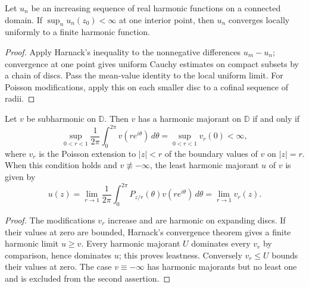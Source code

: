 \begin{theorem}
  \label{thm:harnack_convergence}
  \leanok
  Let $u_n$ be an increasing sequence of real harmonic functions on a
  connected domain. If $\sup_n u_n(z_0)<\infty$ at one interior point,
  then $u_n$ converges locally uniformly to a finite harmonic function.
  \begin{proof}
    \leanok
    Apply Harnack's inequality to the nonnegative differences $u_m-u_n$;
    convergence at one point gives uniform Cauchy estimates on compact
    subsets by a chain of discs. Pass the mean-value identity to the local
    uniform limit. For Poisson modifications, apply this on each smaller
    disc to a cofinal sequence of radii.
  \end{proof}
\end{theorem}

\begin{theorem}
  \label{thm:I_6_7}
  \leanok
  \mainline
  Let $v$ be subharmonic on $\mathbb{D}$. Then $v$ has a harmonic majorant on
  $\mathbb{D}$ if and only if
  \[
    \sup_{0<r<1}\frac{1}{2\pi}
      \int_0^{2\pi}v(r e^{i\theta})\,d\theta
    = \sup_{0<r<1} v_r(0) < \infty,
  \]
  where $v_r$ is the Poisson extension to $|z|<r$ of the boundary values of
  $v$ on $|z|=r$. When this condition holds and $v\not\equiv-\infty$, the
  least harmonic majorant $u$ of $v$ is given by
  \[
    u(z)=\lim_{r\to 1}
      \frac{1}{2\pi}\int_0^{2\pi}
        P_{z/r}(\theta)v(r e^{i\theta})\,d\theta
      =\lim_{r\to 1}v_r(z).
  \]
  \begin{proof}
    \leanok
    The modifications $v_r$ increase and are harmonic on expanding discs.
    If their values at zero are bounded, Harnack's convergence theorem
    gives a finite harmonic limit $u\ge v$. Every harmonic majorant $U$
    dominates every $v_r$ by comparison, hence dominates $u$; this proves
    leastness. Conversely $v_r\le U$ bounds their values at zero.
    The case $v\equiv-\infty$ has harmonic majorants but no least one and
    is excluded from the second assertion.
  \end{proof}
\end{theorem}

